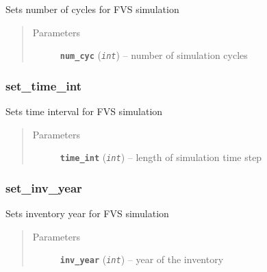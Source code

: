 \documentclass[letterpaper,10pt,english]{sphinxmanual}
\begin{document}
\begin{fulllineitems}
\label{Fvsfuels:fuels.Fvsfuels.set_num_cycles}
Sets number of cycles for FVS simulation
\begin{quote}\begin{description}
\item[{Parameters}] \leavevmode
\textbf{\texttt{num\_cyc}} (\emph{\texttt{int}}) -- number of simulation cycles

\end{description}\end{quote}

\end{fulllineitems}



\subsubsection{set\_time\_int}
\label{Fvsfuels:set-time-int}

\begin{fulllineitems}
\label{Fvsfuels:fuels.Fvsfuels.set_time_int}
Sets time interval for FVS simulation
\begin{quote}\begin{description}
\item[{Parameters}] \leavevmode
\textbf{\texttt{time\_int}} (\emph{\texttt{int}}) -- length of simulation time step

\end{description}\end{quote}

\end{fulllineitems}



\subsubsection{set\_inv\_year}
\label{Fvsfuels:set-inv-year}

\begin{fulllineitems}
\label{Fvsfuels:fuels.Fvsfuels.set_inv_year}
Sets inventory year for FVS simulation
\begin{quote}\begin{description}
\item[{Parameters}] \leavevmode
\textbf{\texttt{inv\_year}} (\emph{\texttt{int}}) -- year of the inventory

\end{description}\end{quote}

\end{fulllineitems}
\end{document}
